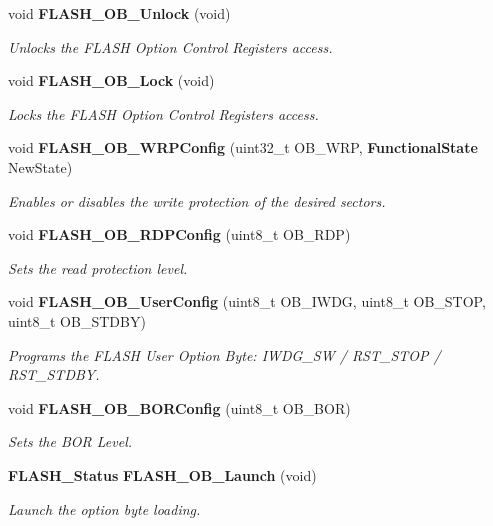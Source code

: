\begin{DoxyCompactItemize}
void \textbf{ F\+L\+A\+S\+H\+\_\+\+O\+B\+\_\+\+Unlock} (void)
\begin{DoxyCompactList}\small\item\em Unlocks the F\+L\+A\+SH Option Control Registers access. \end{DoxyCompactList}\item 
void \textbf{ F\+L\+A\+S\+H\+\_\+\+O\+B\+\_\+\+Lock} (void)
\begin{DoxyCompactList}\small\item\em Locks the F\+L\+A\+SH Option Control Registers access. \end{DoxyCompactList}\item 
void \textbf{ F\+L\+A\+S\+H\+\_\+\+O\+B\+\_\+\+W\+R\+P\+Config} (uint32\+\_\+t O\+B\+\_\+\+W\+RP, \textbf{ Functional\+State} New\+State)
\begin{DoxyCompactList}\small\item\em Enables or disables the write protection of the desired sectors. \end{DoxyCompactList}\item 
void \textbf{ F\+L\+A\+S\+H\+\_\+\+O\+B\+\_\+\+R\+D\+P\+Config} (uint8\+\_\+t O\+B\+\_\+\+R\+DP)
\begin{DoxyCompactList}\small\item\em Sets the read protection level. \end{DoxyCompactList}\item 
void \textbf{ F\+L\+A\+S\+H\+\_\+\+O\+B\+\_\+\+User\+Config} (uint8\+\_\+t O\+B\+\_\+\+I\+W\+DG, uint8\+\_\+t O\+B\+\_\+\+S\+T\+OP, uint8\+\_\+t O\+B\+\_\+\+S\+T\+D\+BY)
\begin{DoxyCompactList}\small\item\em Programs the F\+L\+A\+SH User Option Byte\+: I\+W\+D\+G\+\_\+\+SW / R\+S\+T\+\_\+\+S\+T\+OP / R\+S\+T\+\_\+\+S\+T\+D\+BY. \end{DoxyCompactList}\item 
void \textbf{ F\+L\+A\+S\+H\+\_\+\+O\+B\+\_\+\+B\+O\+R\+Config} (uint8\+\_\+t O\+B\+\_\+\+B\+OR)
\begin{DoxyCompactList}\small\item\em Sets the B\+OR Level. \end{DoxyCompactList}\item 
\textbf{ F\+L\+A\+S\+H\+\_\+\+Status} \textbf{ F\+L\+A\+S\+H\+\_\+\+O\+B\+\_\+\+Launch} (void)
\begin{DoxyCompactList}\small\item\em Launch the option byte loading. \end{DoxyCompactList}\item 

\end{DoxyCompactItemize}

